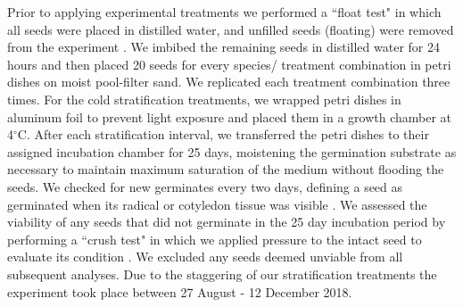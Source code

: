 \documentclass{article}[11pt]
\begin{document}
\noindent  Prior to applying experimental treatments we performed a ``float test" in which all seeds were placed in distilled water, and unfilled seeds (floating) were removed from the experiment \citep{Baskin2014}. We imbibed the remaining seeds in distilled water for 24 hours and then placed 20 seeds for every species/ treatment combination in petri dishes on moist pool-filter sand. We replicated each treatment combination three times. For the cold stratification treatments, we wrapped petri dishes in aluminum foil to prevent light exposure and placed them in a growth chamber at 4$^{\circ}$C. After each stratification interval, we transferred the petri dishes to their assigned incubation chamber for 25 days, moistening the germination substrate as necessary to maintain maximum saturation of the medium without flooding the seeds. We checked for new germinates every two days, defining a seed as germinated when its radical or cotyledon tissue was visible \citep{Baskin2014}. We assessed the viability of any seeds that did not germinate in the 25 day incubation period by performing a ``crush test" in which we applied pressure to the intact seed to evaluate its condition \citep{Baskin2014}. We excluded any seeds deemed unviable from all subsequent analyses. Due to the staggering of our stratification treatments the experiment took place between 27 August - 12 December 2018.
\end{document}
